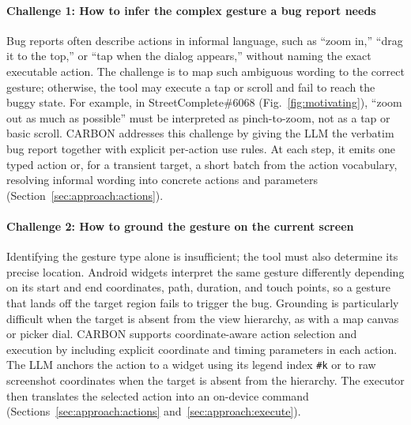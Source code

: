 \documentclass[10pt,conference,a4paper]{IEEEtran}
\begin{document}
  \paragraph*{Challenge 1: How to infer the complex gesture a bug report needs}
  Bug reports often describe actions in informal language, such as ``zoom in,'' ``drag it to the top,'' or ``tap when the dialog appears,'' without naming the exact executable action. The challenge is to map such ambiguous wording to the correct gesture; otherwise, the tool may execute a tap or scroll and fail to reach the buggy state. For example, in StreetComplete\#6068 (Fig.~\ref{fig:motivating}), ``zoom out as much as possible'' must be interpreted as pinch-to-zoom, not as a tap or basic scroll. CARBON addresses this challenge by giving the LLM the verbatim bug report together with explicit per-action use rules. At each step, it emits one typed action or, for a transient target, a short batch from the action vocabulary, resolving informal wording into concrete actions and parameters (Section~\ref{sec:approach:actions}).

  \paragraph*{Challenge 2: How to ground the gesture on the current screen}
Identifying the gesture type alone is insufficient; the tool must also determine its precise location. Android widgets interpret the same gesture differently depending on its start and end coordinates, path, duration, and touch points, so a gesture that lands off the target region fails to trigger the bug. Grounding is particularly difficult when the target is absent from the view hierarchy, as with a map canvas or picker dial. CARBON supports coordinate-aware action selection and execution by including explicit coordinate and timing parameters in each action. The LLM anchors the action to a widget using its legend index \texttt{\#k} or to raw screenshot coordinates when the target is absent from the hierarchy. The executor then translates the selected action into an on-device command (Sections~\ref{sec:approach:actions} and~\ref{sec:approach:execute}).
\end{document}
